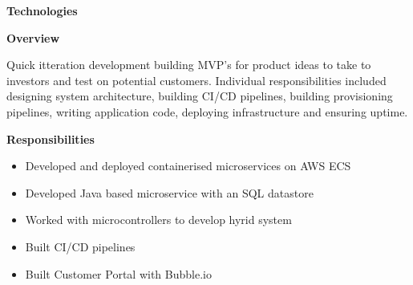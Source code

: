 \documentclass[10pt,a4paper]{altacv}
\begin{document}
\textbf{Technologies}

\divider

\textbf{Overview}

Quick itteration development building MVP's for product ideas to take to investors and test on potential customers. Individual responsibilities included designing system architecture, building CI/CD pipelines, building provisioning pipelines, writing application code, deploying infrastructure and ensuring uptime. 
\divider

\textbf{Responsibilities}
\begin{itemize}
  \item Developed and deployed containerised microservices on AWS ECS
  \item Developed Java based microservice with an SQL datastore
  \item Worked with microcontrollers to develop hyrid system
  \item Built CI/CD pipelines
  \item Built Customer Portal with Bubble.io
\end{itemize}



\clearpage
\end{document}
